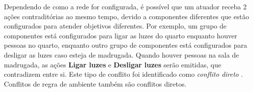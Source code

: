 Dependendo de como a rede for configurada, é possível que um atuador receba 2 ações contraditórias ao mesmo tempo, devido a componentes diferentes que estão configurados para atender objetivos diferentes. Por exemplo, um grupo de componentes está configurados para ligar as luzes do quarto enquanto houver pessoas no quarto, enquanto outro grupo de componentes está configurados para desligar as luzes caso esteja de madrugada. Quando houver pessoas na sala de madrugada, as ações \textbf{Ligar luzes} e \textbf{Desligar luzes} serão emitidas, que contradizem entre si. Este tipo de conflito foi identificado como \textit{conflito direto} \cite{ConflictDetectionORAN}.
Conflitos de regra de ambiente também são conflitos diretos.